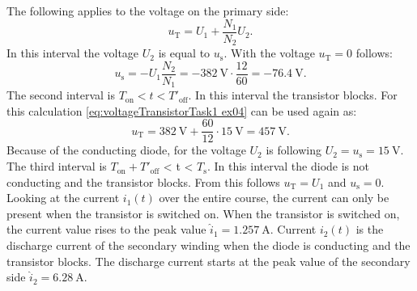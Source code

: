\begin{solutionblock}
    The following applies to the voltage on the primary side:
    \begin{equation}
        u_\mathrm{T} = U_1 + \frac{N_1}{N_2}U_\mathrm{2}.\label{eq:voltageTransistorTask1 ex04}
    \end{equation}
    In this interval the voltage $U_\mathrm{2}$ is equal to $u_\mathrm{s}$. With the voltage $u_\mathrm{T}=0$ follows:
    \begin{equation}
        u_\mathrm{s} = -U_1 \frac{N_2}{N_1} = -\SI{382}{\volt}\cdot\frac{12}{60} = \SI{-76.4}{\volt}.
    \end{equation}
    The second interval is $T_\mathrm{on} < t < T'_\mathrm{off}$. In this interval the transistor blocks. For this calculation \eqref{eq:voltageTransistorTask1 ex04} can be used again as:
    \begin{equation}
        u_\mathrm{T} = \SI{382}{\volt} + \frac{60}{12}\cdot\SI{15}{\volt} = \SI{457}{\volt}.
    \end{equation}
    Because of the conducting diode, for the voltage $U_\mathrm{2}$ is following $U_\mathrm{2} = u_\mathrm{s} = \SI{15}{\volt}$.
    The third interval is $T_\mathrm{on}+T'_\mathrm{off}$ < t < $T_\mathrm{s}$. In this interval the diode is not conducting and the transistor blocks. From this follows $u_\mathrm{T} = U_1$ and $u_\mathrm{s}=0$.
    Looking at the current $i_\mathrm{1}(t)$ over the entire course, the current can only be present when the transistor is switched on. When the transistor is switched on, the current value rises to the peak value $\hat i_\mathrm{1}= \SI{1.257}{\ampere}$. Current $i_\mathrm{2}(t)$ is the discharge current of the secondary winding when the diode is conducting and the transistor blocks. The discharge current starts at the peak value of the secondary side $\hat i_\mathrm{2}= \SI{6.28}{\ampere}$.
    
    
\end{solutionblock}



